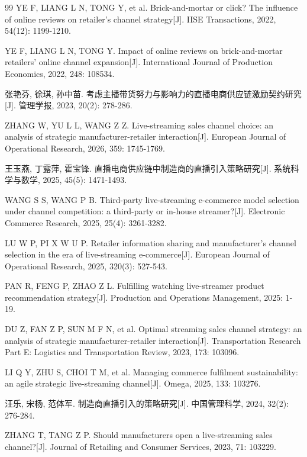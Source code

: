 \documentclass[12pt,a4paper]{article}
\begin{document}
\begin{thebibliography}{99}
YE F, LIANG L N, TONG Y, et al. Brick-and-mortar or click? The influence of online reviews on retailer's channel strategy[J]. IISE Transactions, 2022, 54(12): 1199-1210.

YE F, LIANG L N, TONG Y. Impact of online reviews on brick-and-mortar retailers' online channel expansion[J]. International Journal of Production Economics, 2022, 248: 108534.

张艳芬, 徐琪, 孙中苗. 考虑主播带货努力与影响力的直播电商供应链激励契约研究[J]. 管理学报, 2023, 20(2): 278-286.

ZHANG W, YU L L, WANG Z Z. Live-streaming sales channel choice: an analysis of strategic manufacturer-retailer interaction[J]. European Journal of Operational Research, 2026, 359: 1745-1769.

王玉燕, 丁露萍, 霍宝锋. 直播电商供应链中制造商的直播引入策略研究[J]. 系统科学与数学, 2025, 45(5): 1471-1493.

WANG S S, WANG P B. Third-party live-streaming e-commerce model selection under channel competition: a third-party or in-house streamer?[J]. Electronic Commerce Research, 2025, 25(4): 3261-3282.

LU W P, PI X W U P. Retailer information sharing and manufacturer's channel selection in the era of live-streaming e-commerce[J]. European Journal of Operational Research, 2025, 320(3): 527-543.

PAN R, FENG P, ZHAO Z L. Fulfilling watching live-streamer product recommendation strategy[J]. Production and Operations Management, 2025: 1-19.

DU Z, FAN Z P, SUN M F N, et al. Optimal streaming sales channel strategy: an analysis of strategic manufacturer-retailer interaction[J]. Transportation Research Part E: Logistics and Transportation Review, 2023, 173: 103096.

LI Q Y, ZHU S, CHOI T M, et al. Managing commerce fulfilment sustainability: an agile strategic live-streaming channel[J]. Omega, 2025, 133: 103276.

汪乐, 宋杨, 范体军. 制造商直播引入的策略研究[J]. 中国管理科学, 2024, 32(2): 276-284.

ZHANG T, TANG Z P. Should manufacturers open a live-streaming sales channel?[J]. Journal of Retailing and Consumer Services, 2023, 71: 103229.


\end{thebibliography}
\end{document}
